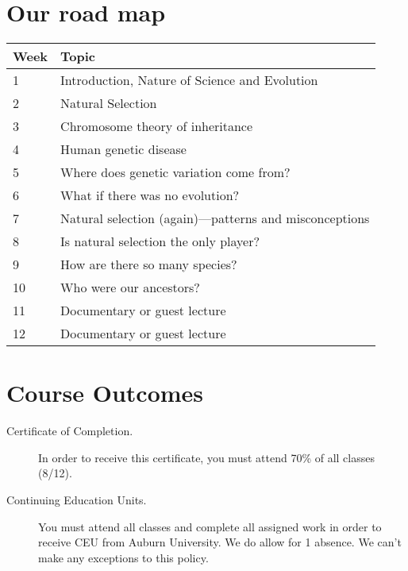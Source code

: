 \section{Our road map}

\noindent\begin{tabular}{ p{0.8in} p{5.0in} }
    \hline
    \textbf{Week} & \textbf{Topic} \\
    \hline
    1  & Introduction, Nature of Science and Evolution \\
    2  & Natural Selection \\
    3  & Chromosome theory of inheritance \\
    4  & Human genetic disease \\
    5  & Where does genetic variation come from? \\
    6  & What if there was no evolution? \\
    7  & Natural selection (again)---patterns and misconceptions \\
    8  & Is natural selection the only player? \\
    9  & How are there so many species? \\
    10 & Who were our ancestors? \\
    11 & Documentary or guest lecture \\
    12 & Documentary or guest lecture \\
    \hline
\end{tabular}

\newpage

\section{Course Outcomes}
\begin{description}
    \item [Certificate of Completion.]
        In order to receive this certificate, you must attend 70\% of all
        classes (8/12).
    \item [Continuing Education Units.]
        You must attend all classes and complete all assigned work in order to
        receive CEU from Auburn University. We do allow for 1 absence. We can't
        make any exceptions to this policy.
\end{description}


